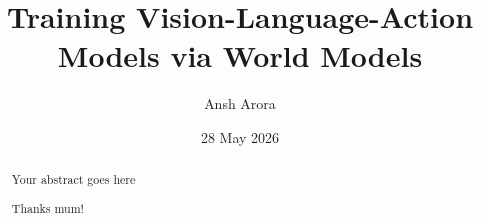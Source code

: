 \documentclass[a4paper, twoside]{report}
\title{Training Vision-Language-Action Models via World Models}
\author{Ansh Arora}
\date{28 May 2026}
\begin{document}


\begin{abstract}
Your abstract goes here
\end{abstract}

\renewcommand{\abstractname}{Acknowledgements}
\begin{abstract}
Thanks mum!
\end{abstract}

\tableofcontents
\listoffigures
\listoftables










\end{document}

